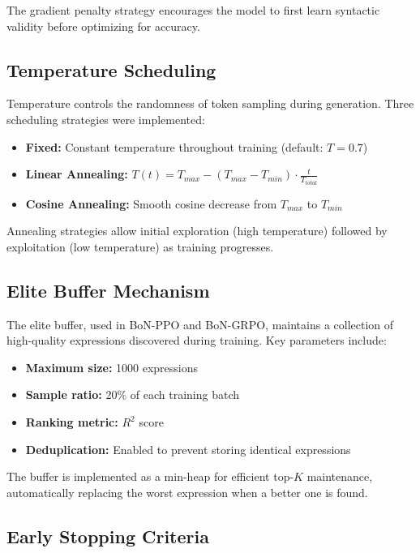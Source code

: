 The gradient penalty strategy encourages the model to first learn syntactic validity before optimizing for accuracy.

\subsection{Temperature Scheduling}

Temperature controls the randomness of token sampling during generation. Three scheduling strategies were implemented:

\begin{itemize}
    \item \textbf{Fixed:} Constant temperature throughout training (default: $T = 0.7$)
    \item \textbf{Linear Annealing:} $T(t) = T_{max} - (T_{max} - T_{min}) \cdot \frac{t}{T_{total}}$
    \item \textbf{Cosine Annealing:} Smooth cosine decrease from $T_{max}$ to $T_{min}$
\end{itemize}

Annealing strategies allow initial exploration (high temperature) followed by exploitation (low temperature) as training progresses.

\subsection{Elite Buffer Mechanism}

The elite buffer, used in BoN-PPO and BoN-GRPO, maintains a collection of high-quality expressions discovered during training. Key parameters include:

\begin{itemize}
    \item \textbf{Maximum size:} 1000 expressions
    \item \textbf{Sample ratio:} 20\% of each training batch
    \item \textbf{Ranking metric:} $R^2$ score
    \item \textbf{Deduplication:} Enabled to prevent storing identical expressions
\end{itemize}

The buffer is implemented as a min-heap for efficient top-$K$ maintenance, automatically replacing the worst expression when a better one is found.

\subsection{Early Stopping Criteria}

